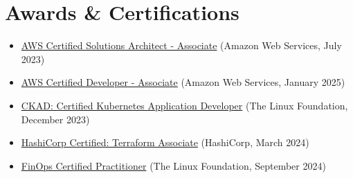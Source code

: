 \documentclass[11pt,a4paper]{article}
\newcommand{\sectionspace}{\vspace{1mm}}
\begin{document}
\section{Awards \& Certifications}
\sectionspace
\begin{itemize}[itemsep=-2pt]
	\item \href{https://www.credly.com/badges/30354133-56e3-40c4-b1d9-67dad6ab2463/public_url}{AWS Certified Solutions Architect - Associate} (Amazon Web Services, July 2023)
	\item \href{https://www.credly.com/badges/38390b39-c573-4cec-b15e-7883aef5701b/public_url}{AWS Certified Developer - Associate} (Amazon Web Services, January 2025)
	\item \href{https://www.credly.com/badges/df9b85f0-efc1-44fa-bac0-ded529c613cc/public_url}{CKAD: Certified Kubernetes Application Developer} (The Linux Foundation, December 2023)
	\item \href{https://www.credly.com/badges/154a08b2-760e-40ab-884f-ea50fd38cf91/public_url}{HashiCorp Certified: Terraform Associate} (HashiCorp, March 2024)
	\item \href{https://www.credly.com/badges/706bbe29-8d02-48d7-9ee8-c639ff43458c/public_url}{FinOps Certified Practitioner} (The Linux Foundation, September 2024)
\end{itemize}
\end{document}
